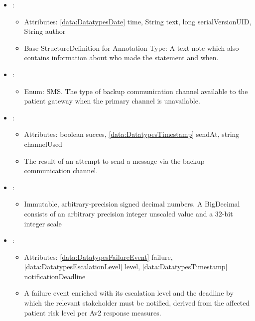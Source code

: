\begin{itemize}[nolistsep,noitemsep]
\item {}: 
\begin{itemize}[noitemsep,nolistsep]
\item[] Attributes: \ref{data:DatatypesDate} time, String text, long serialVersionUID, String author
\item[] Base StructureDefinition for Annotation Type: A  text note which also  contains information about who made the statement and when.
\end{itemize}

\item {}: 
\begin{itemize}[noitemsep,nolistsep]

\item[] Enum: SMS.
  The type of backup communication channel available to the 
  patient gateway when the primary channel is unavailable.
\end{itemize}

\item {}: 
\begin{itemize}[noitemsep,nolistsep]
\item[] Attributes: boolean succes, \ref{data:DatatypesTimestamp} sendAt, string channelUsed
\item[] The result of an attempt to send a message via the backup 
  communication channel.
\end{itemize}

\item {}: 
\begin{itemize}[noitemsep,nolistsep]

\item[] Immutable, arbitrary-precision signed decimal numbers. A BigDecimal consists of an arbitrary precision integer unscaled value and a 32-bit integer scale
\end{itemize}

\item {}: 
\begin{itemize}[noitemsep,nolistsep]
\item[] Attributes: \ref{data:DatatypesFailureEvent} failure, \ref{data:DatatypesEscalationLevel} level, \ref{data:DatatypesTimestamp} notificationDeadline
\item[] A failure event enriched with its escalation level and the 
  deadline by which the relevant stakeholder must be notified, 
  derived from the affected patient risk level per Av2 response 
  measures.
\end{itemize}


\end{itemize}

